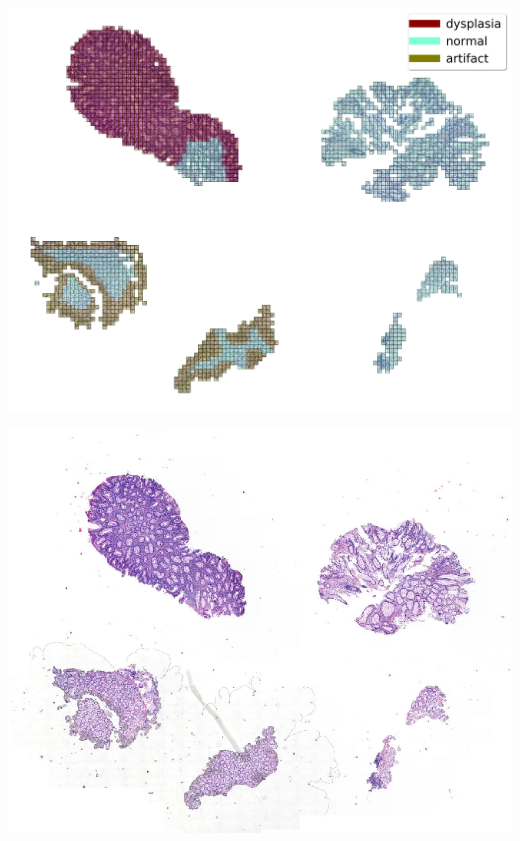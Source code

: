 \documentclass[a4paper,12pt]{article}
\begin{document}
\begin{minipage}[t]{0.45\textwidth}
    \centering
    \includegraphics[width=\textwidth]{082_19_16683_zoom_1.15.png}
    \label{fig:preprocessedslide}
\end{minipage} \qquad
\begin{minipage}[t]{0.45\textwidth}
    \centering
    \includegraphics[width=\textwidth]{082_qupath.png}
    \label{fig:origslide}
\end{minipage}
\end{document}
